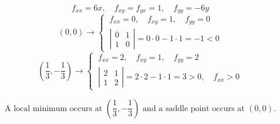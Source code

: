 \documentclass[a4paper, 12pt]{article}
\begin{document}
\begin{enumerate}[leftmargin=*,label=\textbf{\arabic*.}]
\[f_{xx}=6x,\quad f_{xy}=f_{yx}=1,\quad f_{yy}=-6y\]
\[(0,0)\rightarrow\left\{\:\begin{array}{l}
f_{xx}=0,\quad f_{xy}=1,\quad f_{yy}=0\\[1em]
\left|\begin{array}{cc}
0 & 1\\
1 & 0
\end{array}\right|=0\cdot0-1\cdot1=-1<0
\end{array}\right.\]
\[\left(\frac13,-\frac13\right)\rightarrow\left\{\:\begin{array}{l}
f_{xx}=2,\quad f_{xy}=1,\quad f_{yy}=2\\[1em]
\left|\begin{array}{cc}
2 & 1\\
1 & 2
\end{array}\right|=2\cdot2-1\cdot1=3>0,\quad f_{xx}>0
\end{array}\right.\]

\[\boxed{\text{A local minimum occurs at }\left(\frac13,-\frac13\right)\text{ and a saddle point occurs at }(0,0).}\]
\end{enumerate}

\newpage
{}
{}


\end{document}
